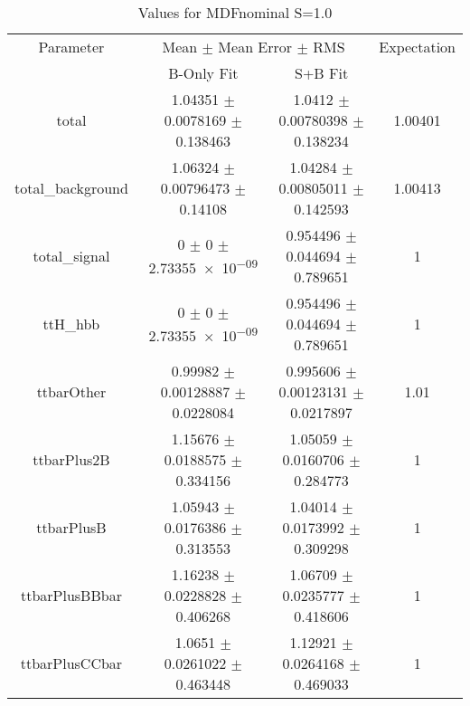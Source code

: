 \begin{table}
\centering
\caption{Values for MDFnominal S=1.0}
\begin{tabular}{cccc}
\toprule
Parameter & \multicolumn{2}{c}{Mean $\pm$ Mean Error $\pm$ RMS} & Expectation\\
 & B-Only Fit & S+B Fit & \\
\midrule
total & \num{1.04351} $\pm$ \num{0.0078169} $\pm$ \num{0.138463} & \num{1.0412} $\pm$ \num{0.00780398} $\pm$ \num{0.138234} & \num{1.00401}\\
total\_background & \num{1.06324} $\pm$ \num{0.00796473} $\pm$ \num{0.14108} & \num{1.04284} $\pm$ \num{0.00805011} $\pm$ \num{0.142593} & \num{1.00413}\\
total\_signal & \num{0} $\pm$ \num{0} $\pm$ \num{2.73355e-09} & \num{0.954496} $\pm$ \num{0.044694} $\pm$ \num{0.789651} & \num{1}\\
ttH\_hbb & \num{0} $\pm$ \num{0} $\pm$ \num{2.73355e-09} & \num{0.954496} $\pm$ \num{0.044694} $\pm$ \num{0.789651} & \num{1}\\
ttbarOther & \num{0.99982} $\pm$ \num{0.00128887} $\pm$ \num{0.0228084} & \num{0.995606} $\pm$ \num{0.00123131} $\pm$ \num{0.0217897} & \num{1.01}\\
ttbarPlus2B & \num{1.15676} $\pm$ \num{0.0188575} $\pm$ \num{0.334156} & \num{1.05059} $\pm$ \num{0.0160706} $\pm$ \num{0.284773} & \num{1}\\
ttbarPlusB & \num{1.05943} $\pm$ \num{0.0176386} $\pm$ \num{0.313553} & \num{1.04014} $\pm$ \num{0.0173992} $\pm$ \num{0.309298} & \num{1}\\
ttbarPlusBBbar & \num{1.16238} $\pm$ \num{0.0228828} $\pm$ \num{0.406268} & \num{1.06709} $\pm$ \num{0.0235777} $\pm$ \num{0.418606} & \num{1}\\
ttbarPlusCCbar & \num{1.0651} $\pm$ \num{0.0261022} $\pm$ \num{0.463448} & \num{1.12921} $\pm$ \num{0.0264168} $\pm$ \num{0.469033} & \num{1}\\
\bottomrule
\end{tabular}
\end{table}
